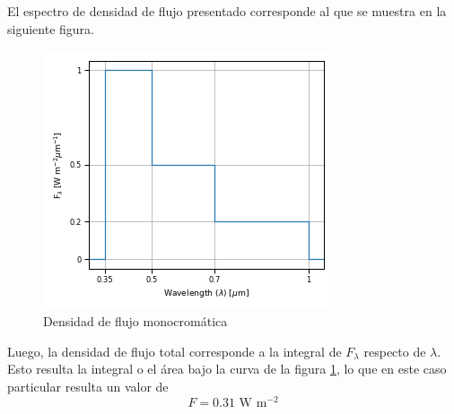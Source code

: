\documentclass{tarea}
\author{Benjamín Edwards}
\date{\Mes, \the\year}
\begin{document}
\maketitle

\setcounter{section}{4}
\setcounter{subsection}{13}
\subsection{}
El espectro de densidad de flujo presentado corresponde al que se muestra en la siguiente figura.

\begin{figure}[htpb]
    \centering
    \includegraphics[]{figs/F_lambda}
    \caption{Densidad de flujo monocromática}
    \label{fig:F_lambda}
\end{figure}
Luego, la densidad de flujo total corresponde a la integral de $F_\lambda$ respecto de $\lambda$. Esto resulta la integral o el área bajo la curva de la figura \ref{fig:F_lambda}, lo que en este caso particular resulta un valor de
\begin{equation}
    F = 0.31\text{ W m$^{-2}$} \label{F}
\end{equation}
\end{document}
